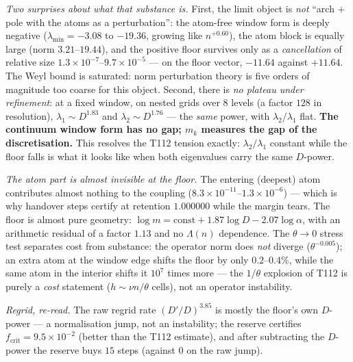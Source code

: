 \documentclass[11pt,a4paper]{article}
\begin{document}
\emph{Two surprises about what that substance is.} First, the limit object is \emph{not} ``arch $+$
pole with the atoms as a perturbation'': the atom-free window form is deeply negative
($\lambda_{\min}=-3.08$ to $-19.36$, growing like $n^{+0.60}$), the atom block is equally large
(norm $3.21$--$19.44$), and the positive floor survives only as a \emph{cancellation} of relative
size $1.3\times10^{-7}$--$9.7\times10^{-5}$ --- on the floor vector, $-11.64$ against $+11.64$. The
Weyl bound is saturated: norm perturbation theory is five orders of magnitude too coarse for this
object. Second, there is \emph{no plateau under refinement}: at a fixed window, on nested grids
over $8$ levels (a factor $128$ in resolution), $\lambda_1\sim D^{1.83}$ and $\lambda_2\sim
D^{1.76}$ --- the \emph{same} power, with $\lambda_2/\lambda_1$ flat. \textbf{The continuum window
form has no gap; $m_k$ measures the gap of the discretisation.} This resolves the T112 tension
exactly: $\lambda_2/\lambda_1$ constant while the floor falls is what it looks like when both
eigenvalues carry the same $D$-power.

\emph{The atom part is almost invisible at the floor.} The entering (deepest) atom contributes
almost nothing to the coupling ($8.3\times10^{-11}$--$1.3\times10^{-6}$) --- which is why handover
steps certify at retention $1.000000$ while the margin tears. The floor is almost pure geometry:
$\log m=\mathrm{const}+1.87\log D-2.07\log\alpha$, with an arithmetic residual of a factor $1.13$
and no $\Lambda(n)$ dependence. The $\theta\to0$ stress test separates cost from substance: the
operator norm does \emph{not} diverge ($\theta^{-0.005}$); an extra atom at the window edge shifts
the floor by only $0.2$--$0.4\%$, while the same atom in the interior shifts it $10^7$ times more
--- the $1/\theta$ explosion of T112 is purely a \emph{cost} statement ($h\sim\nu n/\theta$ cells),
not an operator instability.

\emph{Regrid, re-read.} The raw regrid rate $(D'/D)^{3.85}$ is mostly the floor's own $D$-power ---
a normalisation jump, not an instability; the reserve certifies $f_{\mathrm{crit}}=9.5\times10^{-2}$
(better than the T112 estimate), and after subtracting the $D$-power the reserve buys $15$ steps
(against $0$ on the raw jump).
\end{document}
